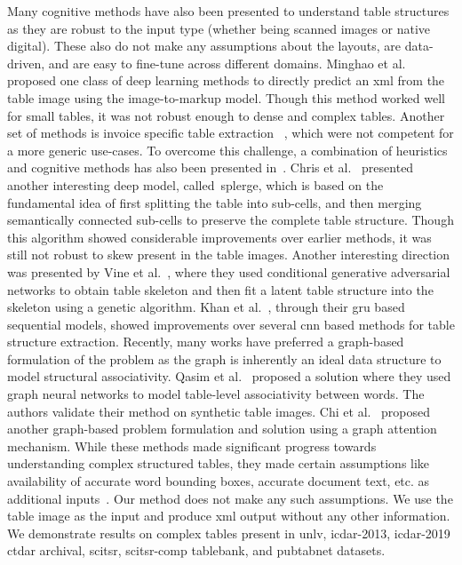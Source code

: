 \documentclass[runningheads]{llncs}
\begin{document}
Many cognitive methods \cite{nishida2017understanding,schreiber2017deepdesrt,bao2018table,qasim2019rethinking,table_splitting,li2019tablebank,paliwal2019tablenet,chi2019complicated,Khan_2019,Siddiqui2019Rethinking,deng2019challenges,adiga2019table,table_invoice,holevcek2019line,deng2019table2vec,le2019extracting,sage2019recurrent} have also been presented to understand table structures as they are robust to the input type (whether being scanned images or native digital). These also do not make any assumptions about the layouts, are data-driven, and are easy to fine-tune across different domains. Minghao et al.~\cite{li2019tablebank} proposed one class of deep learning methods to directly predict an {\sc xml} from the table image using the image-to-markup model. Though this method worked well for small tables, it was not robust enough to dense and complex tables. Another set of methods is invoice specific table extraction ~\cite{table_invoice,holevcek2019line}, which were not competent for a more generic use-cases. To overcome this challenge, a combination of heuristics and cognitive methods has also been presented in~\cite{paliwal2019tablenet}. Chris et al.~\cite{table_splitting} presented another interesting deep model, called~{\sc splerge}, which is based on the fundamental idea of first splitting the table into sub-cells, and then merging semantically connected sub-cells to preserve the complete table structure. Though this algorithm showed considerable improvements over earlier methods, it was still not robust to skew present in the table images. Another interesting direction was presented by Vine et al.~\cite{le2019extracting}, where they used conditional generative adversarial networks to obtain table skeleton and then fit a latent table structure into the skeleton using a genetic algorithm. Khan et al.~\cite{Khan_2019}, through their {\sc gru} based sequential models, showed improvements over several {\sc cnn} based methods for table structure extraction. Recently, many works have preferred a graph-based formulation of the problem as the graph is inherently an ideal data structure to model structural associativity. Qasim et al.~\cite{qasim2019rethinking} proposed a solution where they used graph neural networks to model table-level associativity between words. The authors validate their method on synthetic table images. Chi et al.~\cite{chi2019complicated} proposed another graph-based problem formulation and solution using a graph attention mechanism. While these methods made significant progress towards understanding complex structured tables, they made certain assumptions like availability of accurate word bounding boxes, accurate document text, etc. as additional inputs~\cite{nishida2017understanding,qasim2019rethinking,chi2019complicated}. Our method does not make any such assumptions. We use the table image as the input and produce {\sc xml} output without any other information. We demonstrate results on complex tables present in {\sc unlv}, {\sc icdar}-2013, {\sc icdar}-2019 c{\sc td}a{\sc r} archival, {\sc s}ci{\sc tsr}, {\sc s}ci{\sc tsr-comp} {\sc t}able{\sc b}ank, and {\sc p}ub{\sc t}ab{\sc n}et datasets.
\end{document}
